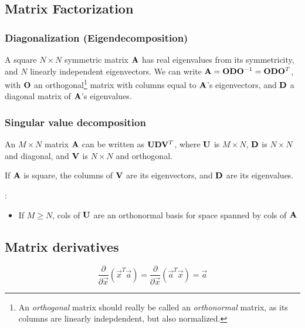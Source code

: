 \documentclass[11pt]{article}
\begin{document}
\begin{appendices}
\subsection{Matrix Factorization}
\subsubsection{Diagonalization (Eigendecomposition)}
\label{subsubsec:matrix}
A square $N \times N$ symmetric matrix $\mathbf{A}$ has real eigenvalues from its symmetricity,
and $N$ linearly independent eigenvectors. We can write
$\mathbf{A} = \mathbf{O} \mathbf{D} \mathbf{O}^{-1} = \mathbf{O} \mathbf{D} \mathbf{O}^T$, with $\mathbf{O}$ an orthogonal\footnote{An
  \emph{orthogonal} matrix should really be called an \emph{orthonormal} matrix, as its
  columns are linearly indepdendent, but also normalized.} matrix with columns equal to
$\mathbf{A}$'s eigenvectors, and $\mathbf{D}$ a diagonal matrix of $\mathbf{A}$'s eigenvalues.


\subsubsection{Singular value decomposition}
\label{subsubsec:SVD}
An $M \times N$ matrix $\mathbf{A}$ can be written as $\mathbf{U} \mathbf{D} \mathbf{V}^T$, where $\mathbf{U}$ is
$M \times N$, $\mathbf{D}$ is $N \times N$ and diagonal, and $\mathbf{V}$ is $N \times N$ and
orthogonal.

If $\mathbf{A}$ is square, the columns of $\mathbf{V}$ are its eigenvectors, and $\mathbf{D}$ are its
eigenvalues.

:
\begin{itemize}
  \item If $M \geq N$, cols of $\mathbf{U}$ are an orthonormal basis for space spanned by cols
  of $\mathbf{A}$
\end{itemize}

\TODOFIN{}

\subsection{Matrix derivatives}

\begin{equation}
  \frac{\partial}{\partial \vec{x}} \left( \vec{x}^T \vec{a} \right) =
  \frac{\partial}{\partial \vec{x}} \left( \vec{a}^T \vec{x} \right) =
  \vec{a} 
\end{equation}





\end{appendices}
\end{document}
